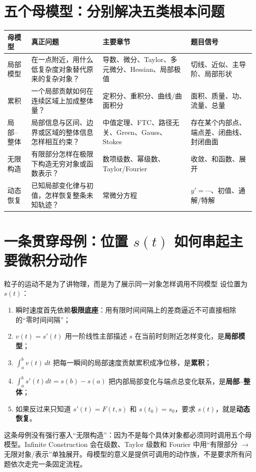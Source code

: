 \documentclass[11pt,a4paper,openany]{ctexbook}
\newcommand{\key}[1]{\textbf{\color{deep}#1}}
\begin{document}
\section{五个母模型：分别解决五类根本问题}
\begin{longtable}{L{2.4cm}L{4.0cm}L{3.6cm}L{\dimexpr\linewidth-10.37cm\relax}}
\toprule
\textbf{母模型} & \textbf{真正问题} & \textbf{主要章节} & \textbf{题目信号}\\
\midrule
局部模型 & 在一点附近，用什么低复杂度对象替代原来的复杂对象？ & 导数、微分、Taylor、多元微分、Hessian、局部极值 & 切线、近似、主导阶、局部形状\\
累积 & 一个局部贡献如何在连续区域上加成整体量？ & 定积分、重积分、曲线/曲面积分 & 面积、质量、功、流量、总量\\
局部--整体 & 局部信息与区间、边界或区域的整体信息怎样相互约束？ & 中值定理、FTC、路径无关、Green、Gauss、Stokes & 存在某个内部点、端点差、闭曲线、封闭曲面\\
无限构造 & 有限部分怎样在极限下构造无穷对象或函数表示？ & 数项级数、幂级数、Taylor/Fourier & 收敛、和函数、展开\\
动态恢复 & 已知局部变化律与初值，怎样恢复整条未知轨迹？ & 常微分方程 & $y'=\cdots$、初值、通解/特解\\
\bottomrule
\end{longtable}

\section{一条贯穿母例：位置 \texorpdfstring{$s(t)$}{s(t)} 如何串起主要微积分动作}
\begin{examplebox}{粒子的运动不是为了讲物理，而是为了展示同一对象怎样调用不同模型}
设位置为 $s(t)$：
\begin{enumerate}
  \item 瞬时速度首先依赖\key{极限底座}：用有限时间间隔上的差商逼近不可直接相除的“零时间间隔”；
  \item $v(t)=s'(t)$ 用一阶线性主部描述 $s$ 在当前时刻附近怎样变化，是\key{局部模型}；
  \item $\int_a^b v(t)\,dt$ 把每一瞬间的局部速度贡献累积成净位移，是\key{累积}；
  \item $\int_a^b s'(t)dt=s(b)-s(a)$ 把内部局部变化与端点总变化联系，是\key{局部--整体}；
  \item 如果反过来只知道 $s'(t)=F(t,s)$ 和 $s(t_0)=s_0$，要求 $s(t)$，就是\key{动态恢复}。
\end{enumerate}
这条母例没有强行塞入“无限构造”：因为不是每个具体对象都必须同时调用五个母模型。Infinite Construction 会在级数、Taylor 级数和 Fourier 中用“有限部分 $\to$ 无限对象/表示”单独展开。母模型的意义是提供可调用的动作族，不是要求所有问题依次走完一条固定流程。
\end{examplebox}
\end{document}
